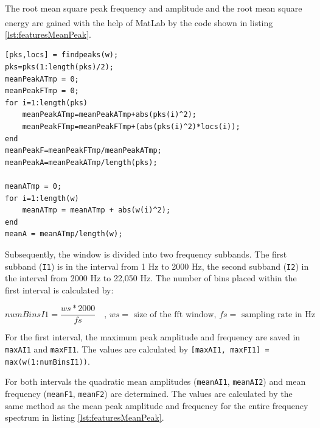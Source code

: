 The root mean square peak frequency and amplitude and the root mean square energy are gained with the help of MatLab\textsuperscript{\textregistered} by the code shown in listing \ref{lst:featuresMeanPeak}.

\begin{lstlisting}[caption={Calculation of the mean peak frequency and amplitude and the root mean square energy of window w.},label={lst:featuresMeanPeak}]
[pks,locs] = findpeaks(w);
pks=pks(1:length(pks)/2);
meanPeakATmp = 0;
meanPeakFTmp = 0;
for i=1:length(pks)
	meanPeakATmp=meanPeakATmp+abs(pks(i)^2);
	meanPeakFTmp=meanPeakFTmp+(abs(pks(i)^2)*locs(i));
end
meanPeakF=meanPeakFTmp/meanPeakATmp;
meanPeakA=meanPeakATmp/length(pks);

meanATmp = 0;
for i=1:length(w)
	meanATmp = meanATmp + abs(w(i)^2); 
end
meanA = meanATmp/length(w); 
\end{lstlisting}

Subsequently, the window is divided into two frequency subbands. The first subband (\lstinline{I1}) is in the interval from 1 Hz to 2000 Hz, the second subband (\lstinline{I2}) in the interval from 2000 Hz to 22,050 Hz. The number of bins placed within the first interval is calculated by:

\begin{equation}
	numBinsI1 = \frac{ws*2000}{fs} \text{ }\text{ , } ws = \text{ size of the fft window, } fs = \text{ sampling rate in Hz}
\end{equation}

For the first interval, the maximum peak amplitude and frequency are saved in \lstinline{maxAI1} and \lstinline{maxFI1}. The values are calculated by \lstinline{[maxAI1, maxFI1] = max(w(1:numBinsI1))}. 

For both intervals the quadratic mean amplitudes (\lstinline{meanAI1}, \lstinline{meanAI2}) and mean frequency (\lstinline{meanF1}, \lstinline{meanF2}) are determined. The values are calculated by the same method as the mean peak amplitude and frequency for the entire frequency spectrum in listing \ref{lst:featuresMeanPeak}.



